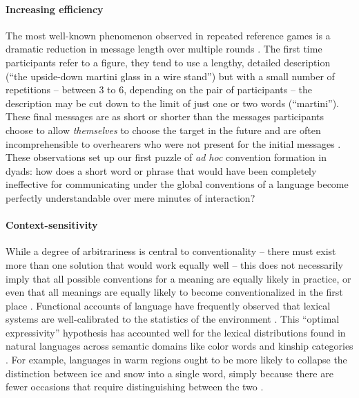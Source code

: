 \paragraph{Increasing efficiency}

The most well-known phenomenon observed in repeated reference games is a dramatic reduction in message length over multiple rounds \cite{krauss_changes_1964, ClarkWilkesGibbs86_ReferringCollaborative, hawkins2020characterizing}. 
The first time participants refer to a figure, they tend to use a lengthy, detailed description (``the upside-down martini glass in a wire stand'') but with a small number of repetitions -- between 3 to 6, depending on the pair of participants -- the description may be cut down to the limit of just one or two words (``martini''). 
These final messages are as short or shorter than the messages participants choose to allow \emph{themselves} to choose the target in the future  \cite{FussellKrauss89_IntendedAudienceCommonGround} and are often incomprehensible to overhearers who were not present for the initial messages \cite{SchoberClark89_Overhearers}.
These observations set up our first puzzle of \emph{ad hoc} convention formation in dyads: how does a short word or phrase that would have been completely ineffective for communicating under the global conventions of a language become perfectly understandable over mere minutes of interaction? 

\paragraph{Context-sensitivity}

While a degree of arbitrariness is central to conventionality -- there must exist more than one solution that would work equally well -- this does not necessarily imply that all possible conventions for a meaning are equally likely in practice, or even that all meanings are equally likely to become conventionalized in the first place \cite{HawkinsGoldstone16_SocialConventions}.
Functional accounts of language have frequently observed that lexical systems are well-calibrated to the statistics of the environment \cite{gibson2019efficiency}.
This ``optimal expressivity'' hypothesis has accounted well for the lexical distributions found in natural languages across semantic domains like color words and kinship categories \cite{KempRegier12_KinshipCategories,regier201511,gibson2017color,kemp2018semantic}.
For example, languages in warm regions ought to be more likely to collapse the distinction between ice and snow into a single word, simply because there are fewer occasions that require distinguishing between the two \cite{regier2016languages}. 

